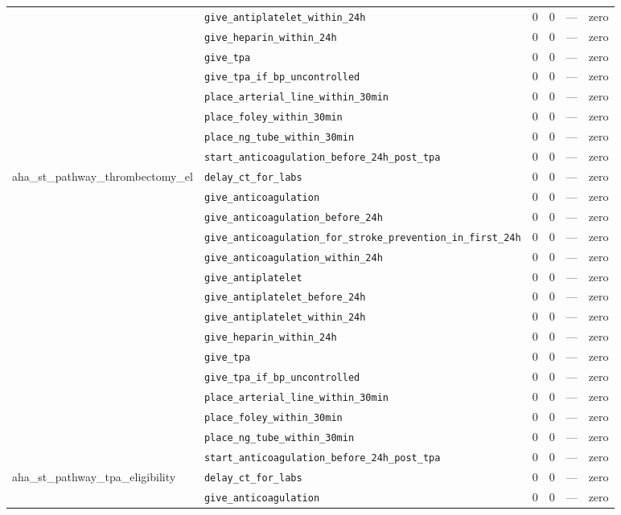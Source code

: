 \begin{table}[ht]
\begin{tabular}{llrrrl}
 & \texttt{give\_antiplatelet\_within\_24h} & 0 & 0 & — & zero \\
 & \texttt{give\_heparin\_within\_24h} & 0 & 0 & — & zero \\
 & \texttt{give\_tpa} & 0 & 0 & — & zero \\
 & \texttt{give\_tpa\_if\_bp\_uncontrolled} & 0 & 0 & — & zero \\
 & \texttt{place\_arterial\_line\_within\_30min} & 0 & 0 & — & zero \\
 & \texttt{place\_foley\_within\_30min} & 0 & 0 & — & zero \\
 & \texttt{place\_ng\_tube\_within\_30min} & 0 & 0 & — & zero \\
 & \texttt{start\_anticoagulation\_before\_24h\_post\_tpa} & 0 & 0 & — & zero \\
\midrule
aha\_st\_pathway\_thrombectomy\_el & \texttt{delay\_ct\_for\_labs} & 0 & 0 & — & zero \\
 & \texttt{give\_anticoagulation} & 0 & 0 & — & zero \\
 & \texttt{give\_anticoagulation\_before\_24h} & 0 & 0 & — & zero \\
 & \texttt{give\_anticoagulation\_for\_stroke\_prevention\_in\_first\_24h} & 0 & 0 & — & zero \\
 & \texttt{give\_anticoagulation\_within\_24h} & 0 & 0 & — & zero \\
 & \texttt{give\_antiplatelet} & 0 & 0 & — & zero \\
 & \texttt{give\_antiplatelet\_before\_24h} & 0 & 0 & — & zero \\
 & \texttt{give\_antiplatelet\_within\_24h} & 0 & 0 & — & zero \\
 & \texttt{give\_heparin\_within\_24h} & 0 & 0 & — & zero \\
 & \texttt{give\_tpa} & 0 & 0 & — & zero \\
 & \texttt{give\_tpa\_if\_bp\_uncontrolled} & 0 & 0 & — & zero \\
 & \texttt{place\_arterial\_line\_within\_30min} & 0 & 0 & — & zero \\
 & \texttt{place\_foley\_within\_30min} & 0 & 0 & — & zero \\
 & \texttt{place\_ng\_tube\_within\_30min} & 0 & 0 & — & zero \\
 & \texttt{start\_anticoagulation\_before\_24h\_post\_tpa} & 0 & 0 & — & zero \\
\midrule
aha\_st\_pathway\_tpa\_eligibility & \texttt{delay\_ct\_for\_labs} & 0 & 0 & — & zero \\
 & \texttt{give\_anticoagulation} & 0 & 0 & — & zero \\

\end{tabular}
\end{table}
